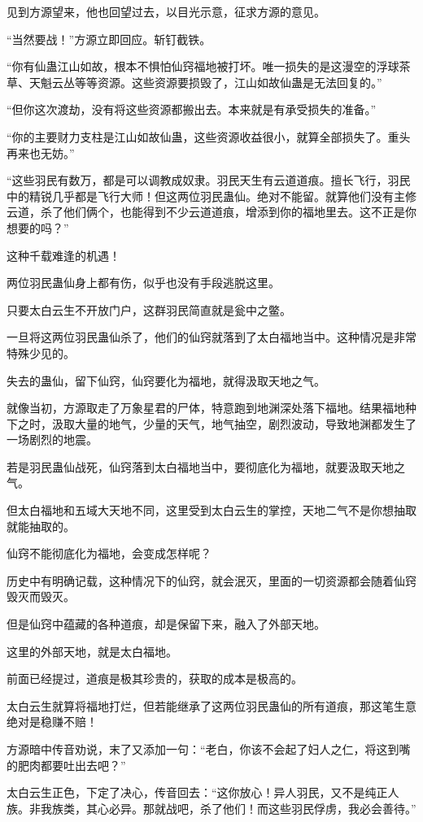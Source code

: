 \begin{this_body}
见到方源望来，他也回望过去，以目光示意，征求方源的意见。

“当然要战！”方源立即回应。斩钉截铁。

“你有仙蛊江山如故，根本不惧怕仙窍福地被打坏。唯一损失的是这漫空的浮球茶草、天魁云丛等等资源。这些资源要损毁了，江山如故仙蛊是无法回复的。”

“但你这次渡劫，没有将这些资源都搬出去。本来就是有承受损失的准备。”

“你的主要财力支柱是江山如故仙蛊，这些资源收益很小，就算全部损失了。重头再来也无妨。”

“这些羽民有数万，都是可以调教成奴隶。羽民天生有云道道痕。擅长飞行，羽民中的精锐几乎都是飞行大师！但这两位羽民蛊仙。绝对不能留。就算他们没有主修云道，杀了他们俩个，也能得到不少云道道痕，增添到你的福地里去。这不正是你想要的吗？”

这种千载难逢的机遇！

两位羽民蛊仙身上都有伤，似乎也没有手段逃脱这里。

只要太白云生不开放门户，这群羽民简直就是瓮中之鳖。

一旦将这两位羽民蛊仙杀了，他们的仙窍就落到了太白福地当中。这种情况是非常特殊少见的。

失去的蛊仙，留下仙窍，仙窍要化为福地，就得汲取天地之气。

就像当初，方源取走了万象星君的尸体，特意跑到地渊深处落下福地。结果福地种下之时，汲取大量的地气，少量的天气，地气抽空，剧烈波动，导致地渊都发生了一场剧烈的地震。

若是羽民蛊仙战死，仙窍落到太白福地当中，要彻底化为福地，就要汲取天地之气。

但太白福地和五域大天地不同，这里受到太白云生的掌控，天地二气不是你想抽取就能抽取的。

仙窍不能彻底化为福地，会变成怎样呢？

历史中有明确记载，这种情况下的仙窍，就会泯灭，里面的一切资源都会随着仙窍毁灭而毁灭。

但是仙窍中蕴藏的各种道痕，却是保留下来，融入了外部天地。

这里的外部天地，就是太白福地。

前面已经提过，道痕是极其珍贵的，获取的成本是极高的。

太白云生就算将福地打烂，但若能继承了这两位羽民蛊仙的所有道痕，那这笔生意绝对是稳赚不赔！

方源暗中传音劝说，末了又添加一句：“老白，你该不会起了妇人之仁，将这到嘴的肥肉都要吐出去吧？”

太白云生正色，下定了决心，传音回去：“这你放心！异人羽民，又不是纯正人族。非我族类，其心必异。那就战吧，杀了他们！而这些羽民俘虏，我必会善待。”


\end{this_body}
